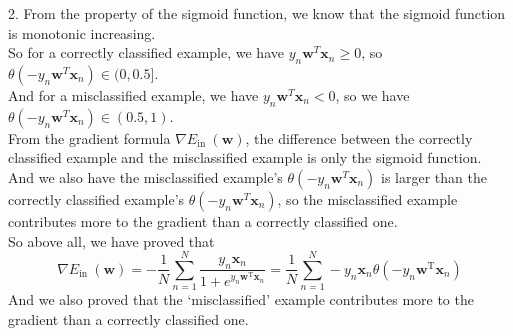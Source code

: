2. From the property of the sigmoid function, we know that the sigmoid function is monotonic increasing.\\
So for a correctly classified example, we have $y_n\mathbf{w}^T\mathbf{x}_n\geq 0$, so $\theta(-y_n\mathbf{w}^T\mathbf{x}_n)\in (0,0.5]$.\\

And for a misclassified example, we have $y_n\mathbf{w}^T\mathbf{x}_n<0$, so we have $\theta(-y_n\mathbf{w}^T\mathbf{x}_n)\in (0.5,1)$.\\

From the gradient formula $\nabla  E_{\text {in }}(\mathbf{w})$, the difference between the correctly classified example and the misclassified example is only the sigmoid function.\\
And we also have the misclassified example's $\theta(-y_n\mathbf{w}^T\mathbf{x}_n)$ is larger than the correctly classified example's $\theta(-y_n\mathbf{w}^T\mathbf{x}_n)$, so the misclassified example contributes more to the gradient than a correctly classified one.\\

So above all, we have proved that
$$\nabla E_{\text {in }}(\mathbf{w})  =-\frac{1}{N} \sum_{n=1}^{N} \frac{y_{n} \mathbf{x}_{n}}{1+e^{y_{n} \mathbf{w}^{\mathrm{T}} \mathbf{x}_{n}}}=\frac{1}{N} \sum_{n=1}^{N}-y_{n} \mathbf{x}_{n} \theta\left(-y_{n} \mathbf{w}^{\mathrm{T}} \mathbf{x}_{n}\right)$$
And we also proved that the `misclassified' example contributes more to the gradient than a correctly classified one.\\

\newpage